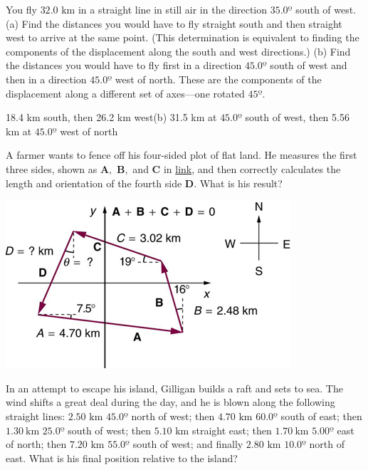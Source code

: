 \documentclass[
]{book}
\begin{document}
\hypertarget{fs-id1874820}{}
\leavevmode{}%
You fly \({\text{32}\text{.}\text{0\ km}}{}\) in a straight line in still
air in the direction \(35.0º{}\) south of west. (a) Find the distances you
would have to fly straight south and then straight west to arrive at the
same point. (This determination is equivalent to finding the components
of the displacement along the south and west directions.) (b) Find the
distances you would have to fly first in a direction \(45.0º{}\) south of
west and then in a direction \(45.0º{}\) west of north. These are the
components of the displacement along a different set of axes---one
rotated \(45º{}\).

\leavevmode{}%
18.4 km south, then 26.2 km west(b) 31.5 km at \(45.0º{}\) south of west,
then 5.56 km at \(45.0º{}\) west of north

\hypertarget{eip-379}{}
\leavevmode{}%
A farmer wants to fence off his four-sided plot of flat land. He
measures the first three sides, shown as \({\mathbf{A},}{}\)
\({\mathbf{B},}{}\) and \(\mathbf{C}{}\) in
\protect\hyperlink{import-auto-id1165298543237}{link}, and then
correctly calculates the length and orientation of the fourth side
\(\mathbf{D}{}\). What is his result?

\includegraphics{images/Figure_03_03_12a.jpg}

\hypertarget{fs-id1849688}{}
\leavevmode{}%
In an attempt to escape his island, Gilligan builds a raft and sets to
sea. The wind shifts a great deal during the day, and he is blown along
the following straight lines: \({2\text{.}\text{50\ km}}{}\) \(45.0º{}\)
north of west; then \({4\text{.}\text{70\ km}}{}\) \(60.0º{}\) south of
east; then \({1.30\ \text{km}}{}\) \(25.0º{}\) south of west; then
\({5\text{.}\text{10\ km}}{}\) straight east; then \({1.70\ \text{km}}{}\)
\(5.00º\) east of north; then \({7\text{.}\text{20\ km}}{}\) \(55.0º\) south
of west; and finally \({2\text{.}\text{80\ km}}{}\) \(10.0º\) north of east.
What is his final position relative to the island?
\end{document}
